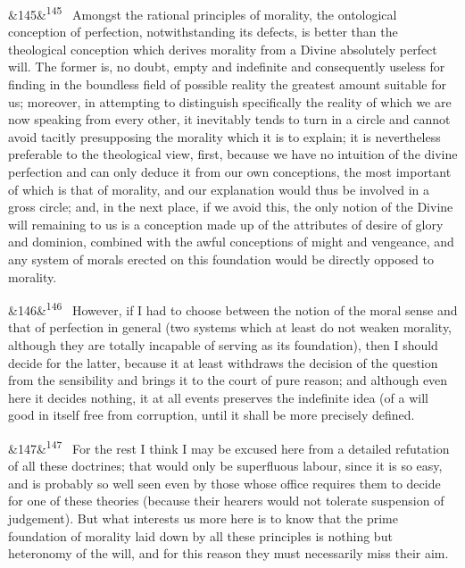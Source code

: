 \documentclass[12pt]{article}
\newcommand{\para}[1][]{\par\noindent\ifx&#1&\else\textsuperscript{\footnotesize #1}~\fi}
\begin{document}
\para[145] Amongst the rational principles of morality, the ontological conception of perfection, notwithstanding its defects, is better than the theological conception which derives morality from a Divine absolutely perfect will. The former is, no doubt, empty and indefinite and consequently useless for finding in the boundless field of possible reality the greatest amount suitable for us; moreover, in attempting to distinguish specifically the reality of which we are now speaking from every other, it inevitably tends to turn in a circle and cannot avoid tacitly presupposing the morality which it is to explain; it is nevertheless preferable to the theological view, first, because we have no intuition of the divine perfection and can only deduce it from our own conceptions, the most important of which is that of morality, and our explanation would thus be involved in a gross circle; and, in the next place, if we avoid this, the only notion of the Divine will remaining to us is a conception made up of the attributes of desire of glory and dominion, combined with the awful conceptions of might and vengeance, and any system of morals erected on this foundation would be directly opposed to morality.

\para[146] However, if I had to choose between the notion of the moral sense and that of perfection in general (two systems which at least do not weaken morality, although they are totally incapable of serving as its foundation), then I should decide for the latter, because it at least withdraws the decision of the question from the sensibility and brings it to the court of pure reason; and although even here it decides nothing, it at all events preserves the indefinite idea (of a will good in itself free from corruption, until it shall be more precisely defined.

\para[147] For the rest I think I may be excused here from a detailed refutation of all these doctrines; that would only be superfluous labour, since it is so easy, and is probably so well seen even by those whose office requires them to decide for one of these theories (because their hearers would not tolerate suspension of judgement). But what interests us more here is to know that the prime foundation of morality laid down by all these principles is nothing but heteronomy of the will, and for this reason they must necessarily miss their aim.
\end{document}
